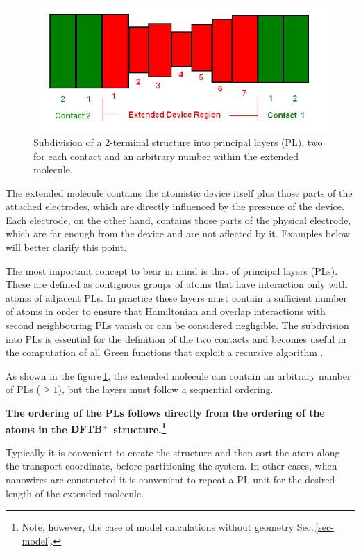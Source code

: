\documentclass[a4paper,11pt,english]{sphinxmanual}
\newcommand{\dftbp}{\textsf{DFTB$^{\text{+}}$\ }} %
\begin{document}
{\begin{figure}[htbp]
\centering
\capstart
\includegraphics[width=0.8\linewidth]{layers.png}
\caption{Subdivision of a 2-terminal structure into principal layers (PL), two for each contact and an arbitrary number within the extended molecule.}
\label{layers}
\end{figure}

The extended molecule contains the atomistic device itself plus those parts of the attached electrodes, which are directly influenced by the presence of the device. Each electrode, on the other hand, contains those parts of the physical electrode, which are far enough from the device and are not affected by it. Examples below will better clarify this point.

The most important concept to bear in mind is that of principal layers (PLs). These are defined as contiguous groups of atoms that have interaction only with atoms of adjacent PLs. In practice these layers must contain a sufficient number of atoms in order to ensure that Hamiltonian and overlap interactions with second neighbouring PLs vanish or can be considered negligible. The subdivision into PLs is essential for the definition of the two contacts and becomes useful in the computation of all Green functions that exploit a recursive algorithm \cite{Pecchia08njp}.

As shown in the figure\,\ref{layers}, the extended molecule can contain an arbitrary number of PLs ($\geqslant 1$), but the layers must follow a sequential ordering.

{\bf The ordering of the PLs follows directly from the ordering of the atoms in the \dftbp structure.\footnote{Note, however, the case of model calculations without geometry Sec.\,\ref{sec-model}.}}

Typically it is convenient to create the structure and then sort the atom along the transport coordinate, before partitioning the system. In other cases, when nanowires are constructed it is convenient to repeat a PL unit for the desired length of the extended molecule.

}
\end{document}
